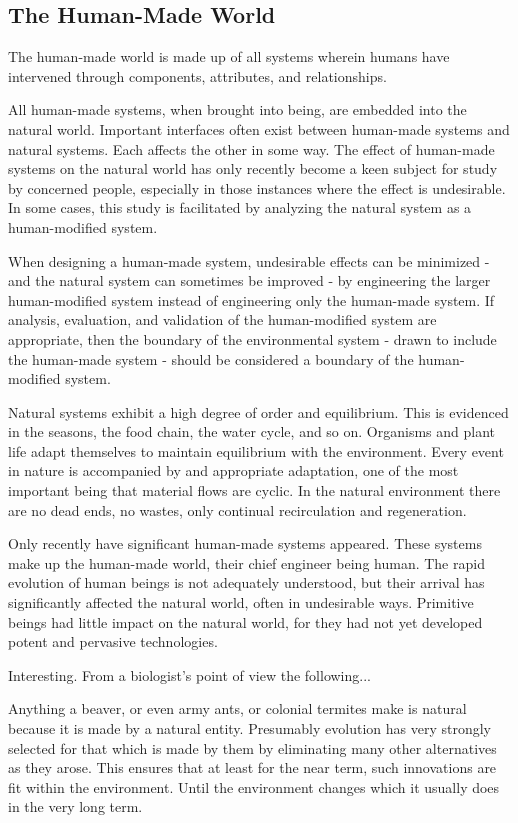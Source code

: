 \subsection{The Human-Made World}\label{subsec:humanMadeWorld}

The human-made world is made up of all systems wherein humans have intervened through components, attributes, and relationships.

All human-made systems, when brought into being, are embedded into the natural world. Important interfaces often exist between human-made systems and natural systems. Each affects the other in some way. The effect of human-made systems on the natural world has only recently become a keen subject for study by concerned people, especially in those instances where the effect is undesirable. In some cases, this study is facilitated by analyzing the natural system as a human-modified system.

When designing a human-made system, undesirable effects can be minimized - and the natural system can sometimes be improved - by engineering the larger human-modified system instead of engineering only the human-made system. If analysis, evaluation, and validation of the human-modified system are appropriate, then the boundary of the environmental system - drawn to include the human-made system - should be considered a boundary of the human-modified system.
	
Natural systems exhibit a high degree of order and equilibrium. This is evidenced in the seasons, the food chain, the water cycle, and so on. Organisms and plant life adapt themselves to maintain equilibrium with the environment. Every event in nature is accompanied by and appropriate adaptation, one of the most important being that material flows are cyclic. In the natural environment there are no dead ends, no wastes, only continual recirculation and regeneration.

Only recently have significant human-made systems appeared. These systems make up the human-made world, their chief engineer being human. The rapid evolution of human beings is not adequately understood, but their arrival has significantly affected the natural world, often in undesirable ways. Primitive beings had little impact on the natural world, for they had not yet developed potent and pervasive technologies.

	Interesting. From a biologist’s point of view the following...
    
Anything a beaver, or even army ants, or colonial termites make is natural because it is made by a natural entity. Presumably evolution has very strongly selected for that which is made by them by eliminating many other alternatives as they arose. This ensures that at least for the near term, such innovations are fit within the environment. Until the environment changes which it usually does in the very long term.


